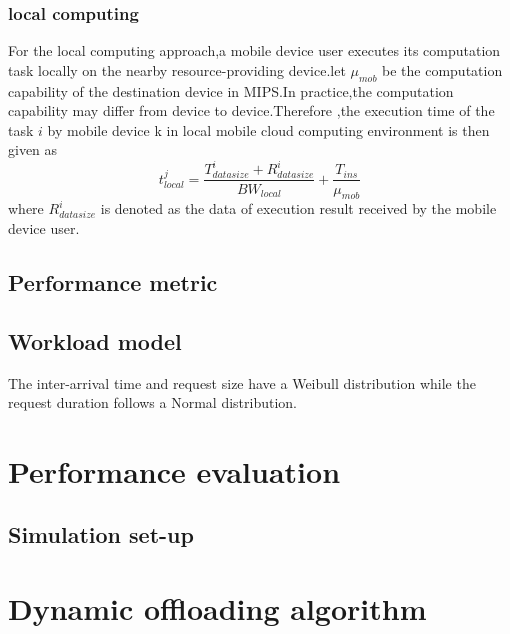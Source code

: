 \documentclass[review]{elsarticle}
\begin{document}
            \subsubsection{local computing}
            For the local computing approach,a mobile device user executes its computation task locally on the nearby resource-providing device.let \begin{math} \mu_{mob}\end{math} be the computation capability of the destination device in MIPS.In practice,the computation capability may differ from device to device.Therefore ,the execution time of the task \begin{math} i\end{math} by mobile device k in local mobile cloud computing environment is then given as \\
            $$ t_{local}^j = \frac{{T_{datasize}^i}+R_{datasize}^i}{BW_{local}}+\frac{T_{ins}}{\mu_{mob}}$$
            where \begin{math}R_{datasize}^i\end{math} is denoted as the data of execution result received by the mobile device user.

        \subsection{Performance metric}
        \subsection{Workload model}
        The inter-arrival time and request size have a Weibull distribution while the request duration follows a Normal distribution.\cite{iosup2008performance}
        \section{Performance evaluation}
            \subsection{Simulation set-up}
            \paragraph{}

\section{Dynamic offloading algorithm}
\end{document}
